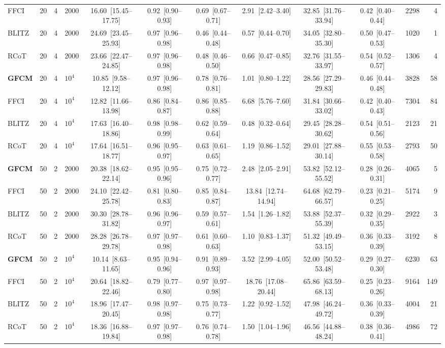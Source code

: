 \begin{table}[t]
{\begin{tabular}{lrrlccccccrr}
FFCI & 20 & 4 & 2000 & 16.60~[15.45--17.75] & 0.92~[0.90--0.93] & 0.69~[0.67--0.71] & 2.91~[2.42--3.40] & 32.85~[31.76--33.94] & 0.42~[0.40--0.44] & 2298 & 4 \\
BLITZ & 20 & 4 & 2000 & 24.69~[23.45--25.93] & 0.97~[0.96--0.98] & 0.46~[0.44--0.48] & 0.57~[0.44--0.70] & 34.05~[32.80--35.30] & 0.50~[0.47--0.53] & 1020 & 1 \\
RCoT & 20 & 4 & 2000 & 23.66~[22.47--24.85] & 0.97~[0.96--0.98] & 0.48~[0.46--0.50] & 0.66~[0.47--0.85] & 32.76~[31.55--33.97] & 0.54~[0.52--0.57] & 1306 & 4 \\
\midrule
\textbf{GFCM} & 20 & 4 & $10^4$ & 10.85~[9.58--12.12] & 0.97~[0.96--0.98] & 0.78~[0.76--0.81] & 1.01~[0.80--1.22] & 28.56~[27.29--29.83] & 0.46~[0.44--0.48] & 3828 & 58 \\
FFCI & 20 & 4 & $10^4$ & 12.82~[11.66--13.98] & 0.86~[0.84--0.87] & 0.86~[0.85--0.88] & 6.68~[5.76--7.60] & 31.84~[30.66--33.02] & 0.42~[0.40--0.43] & 7304 & 84 \\
BLITZ & 20 & 4 & $10^4$ & 17.63~[16.40--18.86] & 0.98~[0.98--0.99] & 0.62~[0.59--0.64] & 0.48~[0.32--0.64] & 29.45~[28.28--30.62] & 0.54~[0.51--0.56] & 2123 & 21 \\
RCoT & 20 & 4 & $10^4$ & 17.64~[16.51--18.77] & 0.96~[0.95--0.97] & 0.63~[0.61--0.65] & 1.19~[0.86--1.52] & 29.01~[27.88--30.14] & 0.55~[0.53--0.58] & 2793 & 50 \\
\midrule
\textbf{GFCM} & 50 & 2 & 2000 & 20.38~[18.62--22.14] & 0.95~[0.95--0.96] & 0.75~[0.72--0.77] & 2.48~[2.05--2.91] & 53.82~[52.12--55.52] & 0.28~[0.26--0.31] & 4065 & 5 \\
FFCI & 50 & 2 & 2000 & 24.10~[22.42--25.78] & 0.81~[0.80--0.83] & 0.85~[0.84--0.87] & 13.84~[12.74--14.94] & 64.68~[62.79--66.57] & 0.23~[0.21--0.25] & 5174 & 9 \\
BLITZ & 50 & 2 & 2000 & 30.30~[28.78--31.82] & 0.96~[0.96--0.97] & 0.59~[0.57--0.61] & 1.54~[1.26--1.82] & 53.88~[52.37--55.39] & 0.32~[0.29--0.35] & 2922 & 3 \\
RCoT & 50 & 2 & 2000 & 28.28~[26.78--29.78] & 0.97~[0.97--0.98] & 0.61~[0.60--0.63] & 1.10~[0.83--1.37] & 51.32~[49.49--53.15] & 0.36~[0.33--0.39] & 3192 & 8 \\
\midrule
\textbf{GFCM} & 50 & 2 & $10^4$ & 10.14~[8.63--11.65] & 0.95~[0.94--0.96] & 0.91~[0.89--0.93] & 3.52~[2.99--4.05] & 52.00~[50.52--53.48] & 0.29~[0.27--0.30] & 6230 & 63 \\
FFCI & 50 & 2 & $10^4$ & 20.64~[18.82--22.46] & 0.79~[0.77--0.80] & 0.97~[0.97--0.98] & 18.76~[17.08--20.44] & 65.86~[63.59--68.13] & 0.25~[0.23--0.26] & 9164 & 149 \\
BLITZ & 50 & 2 & $10^4$ & 18.96~[17.47--20.45] & 0.98~[0.97--0.98] & 0.75~[0.73--0.77] & 1.22~[0.92--1.52] & 47.98~[46.24--49.72] & 0.36~[0.33--0.39] & 4004 & 21 \\
RCoT & 50 & 2 & $10^4$ & 18.36~[16.88--19.84] & 0.97~[0.97--0.98] & 0.76~[0.74--0.78] & 1.50~[1.04--1.96] & 46.56~[44.88--48.24] & 0.38~[0.36--0.41] & 4986 & 72 \\
\bottomrule
\end{tabular}}
\end{table}
